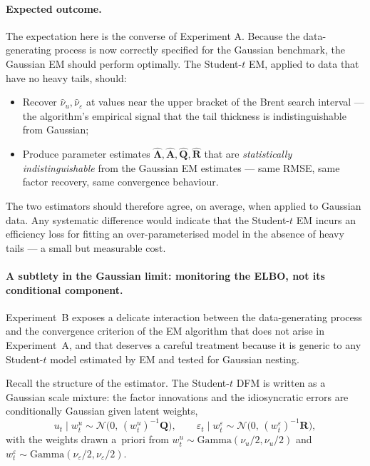 \documentclass[11pt, a4paper, oneside]{article}
\newcommand{\mL}{\boldsymbol{\Lambda}}
\newcommand{\mA}{\mathbf{A}}
\newcommand{\mR}{\mathbf{R}}
\begin{document}
\paragraph{Expected outcome.}
The expectation here is the converse of Experiment A. Because the
data-generating process is now correctly specified for the Gaussian
benchmark, the Gaussian EM should perform optimally. The
Student-$t$ EM, applied to data that have no heavy tails,
should:
\begin{itemize}[leftmargin=1.5em, itemsep=3pt]
    \item Recover $\hat{\nu}_u, \hat{\nu}_\varepsilon$ at values
          near the upper bracket of the Brent search interval — the
          algorithm's empirical signal that the tail thickness is
          indistinguishable from Gaussian;
    \item Produce parameter estimates $\hat{\mL},
          \hat{\mA}, \hat{\mathbf{Q}}, \hat{\mR}$ that are
          \emph{statistically indistinguishable} from the Gaussian EM
          estimates — same RMSE, same factor recovery, same
          convergence behaviour.
\end{itemize}
The two estimators should therefore agree, on average, when applied
to Gaussian data. Any systematic difference would indicate that the
Student-$t$ EM incurs an efficiency loss for fitting an
over-parameterised model in the absence of heavy tails — a small
but measurable cost.


\paragraph{A subtlety in the Gaussian limit: monitoring the ELBO,
not its conditional component.}
Experiment~B exposes a delicate interaction between the
data-generating process and the convergence criterion of the EM
algorithm that does not arise in Experiment~A, and that deserves a
careful treatment because it is generic to any Student-$t$ model
estimated by EM and tested for Gaussian nesting.

Recall the structure of the estimator. The Student-$t$ DFM is written
as a Gaussian scale mixture: the factor innovations and the
idiosyncratic errors are conditionally Gaussian given latent weights,
\[
u_t \mid w^u_t \sim \mathcal{N}\!\big(0,\, (w^u_t)^{-1}\mathbf{Q}\big),
\qquad
\varepsilon_t \mid w^\varepsilon_t \sim \mathcal{N}\!\big(0,\, (w^\varepsilon_t)^{-1}\mathbf{R}\big),
\]
with the weights drawn a~priori from
$w^u_t \sim \mathrm{Gamma}(\nu_u/2,\nu_u/2)$ and
$w^\varepsilon_t \sim \mathrm{Gamma}(\nu_\varepsilon/2,\nu_\varepsilon/2)$.
\end{document}
